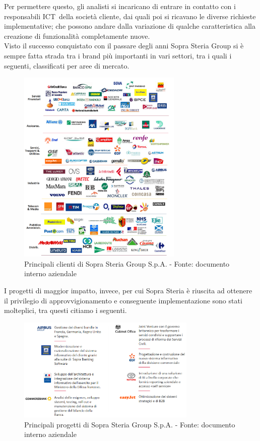 	 Per permettere questo, gli analisti si incaricano di entrare in contatto con i responsabili ICT\glossario\ della società cliente, dai quali poi si ricavano le diverse richieste implementative;  che possono andare dalla variazione di qualche caratteristica alla creazione di funzionalità completamente nuove.\\

	
	Visto il successo conquistato con il passare degli anni Sopra Steria Group si è sempre fatta strada tra i brand più importanti in vari settori, tra i quali i seguenti, classificati per aree di mercato.
	\begin{figure}[H]
	\centering
   	\includegraphics[width=0.7\textwidth]{immagini/principali_referenze}
   	\caption{Principali clienti di Sopra Steria Group S.p.A. - Fonte: documento interno aziendale}
	\end{figure}

	I progetti di maggior impatto, invece, per cui Sopra Steria è riuscita ad ottenere il privilegio di approvvigionamento e conseguente implementazione sono stati molteplici, tra questi citiamo i seguenti.
	\begin{figure}[H]
	\centering
   	\includegraphics[width=0.76\textwidth]{immagini/Progetti_Importanti}
   	\caption{Principali progetti di Sopra Steria Group S.p.A. - Fonte: documento interno aziendale}
	\end{figure}

